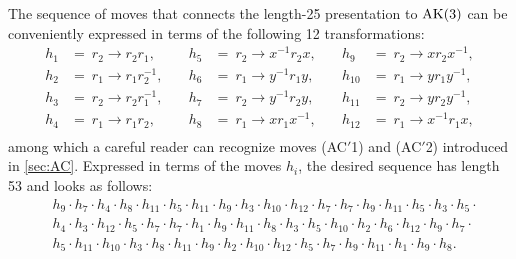 The sequence of moves that connects the length-25 presentation to $\text{AK}(3)$ can be conveniently expressed in terms of the following 12 transformations:
\[
\begin{aligned}
h_1 &= \  r_2 \rightarrow r_2 r_1, & \quad h_5 &= \ r_2 \rightarrow x^{-1} r_2 x, & \quad h_9 &= \ r_2 \rightarrow x r_2 x^{-1}, \\
h_2 &= \ r_1 \rightarrow r_1 r_2^{-1}, & \quad h_6 &= \ r_1 \rightarrow y^{-1} r_1 y, & \quad h_{10} &= \ r_1 \rightarrow y r_1 y^{-1}, \\
h_3 &= \ r_2 \rightarrow r_2 r_1^{-1}, & \quad h_7 &= \ r_2 \rightarrow y^{-1} r_2 y, & \quad h_{11} &= \ r_2 \rightarrow y r_2 y^{-1}, \\
h_4 &= \ r_1 \rightarrow r_1 r_2, & \quad h_8 &= \ r_1 \rightarrow x r_1 x^{-1}, & \quad h_{12} &= \ r_1 \rightarrow x^{-1} r_1 x, \\
\end{aligned}
\]
among which a careful reader can recognize moves (AC$'$1) and (AC$'$2) introduced in \autoref{sec:AC}. Expressed in terms of the moves $h_i$, the desired sequence has length 53 and looks as follows:
\[
\begin{aligned}
& h_9 \cdot h_7 \cdot h_4 \cdot h_8 \cdot h_{11} \cdot h_5 \cdot h_{11} \cdot h_9 \cdot h_3 \cdot h_{10} \cdot h_{12} \cdot h_7 \cdot h_7 \cdot h_9 \cdot h_{11} \cdot h_5 \cdot h_3 \cdot h_5 \cdot \\
& h_4 \cdot h_3 \cdot h_{12} \cdot h_5 \cdot h_7 \cdot h_7 \cdot h_1 \cdot h_9 \cdot h_{11} \cdot h_8 \cdot h_3 \cdot h_5 \cdot h_{10} \cdot h_2 \cdot h_6 \cdot h_{12} \cdot h_9 \cdot h_7 \cdot \\
& h_5 \cdot h_{11} \cdot h_{10} \cdot h_3 \cdot h_8 \cdot h_{11} \cdot h_9 \cdot h_2 \cdot h_{10} \cdot h_{12} \cdot h_5 \cdot h_7 \cdot h_9 \cdot h_{11} \cdot h_1 \cdot h_9 \cdot h_8.
\end{aligned}
\]
